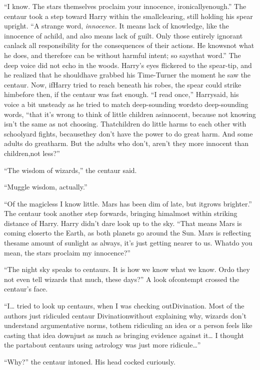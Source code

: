 ``I know. The stars themselves proclaim your innocence, ironicallyenough.'' The centaur took a step toward Harry within the smallclearing, still holding his spear upright. ``A strange word,
\emph{innocence.} It means lack of knowledge, like the innocence of achild, and also means lack of guilt. Only those entirely ignorant canlack all responsibility for the consequences of their actions. He knowsnot what he does, and therefore can be without harmful intent; so saysthat word.'' The deep voice did not echo in the woods.
Harry's eyes flickered to the spear-tip, and he realized that he shouldhave grabbed his Time-Turner the moment he saw the centaur. Now, ifHarry tried to reach beneath his robes, the spear could strike himbefore then, if the centaur was fast enough. ``I read once,'' Harrysaid, his voice a bit unsteady as he tried to match deep-sounding wordsto deep-sounding words, ``that it's wrong to think of little children asinnocent, because not knowing isn't the same as not choosing. Thatchildren do little harms to each other with schoolyard fights, becausethey don't have the power to do great harm. And some adults do greatharm. But the adults who don't, aren't they more innocent than children,not less?''

``The wisdom of wizards,'' the centaur said.

``Muggle wisdom, actually.''

``Of the magicless I know little. Mars has been dim of late, but itgrows brighter.'' The centaur took another step forwards, bringing himalmost within striking distance of Harry.
Harry didn't dare look up to the sky. ``That means Mars is coming closerto the Earth, as both planets go around the Sun. Mars is reflecting thesame amount of sunlight as always, it's just getting nearer to us. Whatdo you mean, the stars proclaim my innocence?''

``The night sky speaks to centaurs. It is how we know what we know. Ordo they not even tell wizards that much, these days?'' A look ofcontempt crossed the centaur's face.

``I\ldots{} tried to look up centaurs, when I was checking outDivination. Most of the authors just ridiculed centaur Divinationwithout explaining why, wizards don't understand argumentative norms, tothem ridiculing an idea or a person feels like casting that idea downjust as much as bringing evidence against it\ldots{} I thought the partabout centaurs using astrology was just more ridicule\ldots{}''

``Why?'' the centaur intoned. His head cocked curiously.

